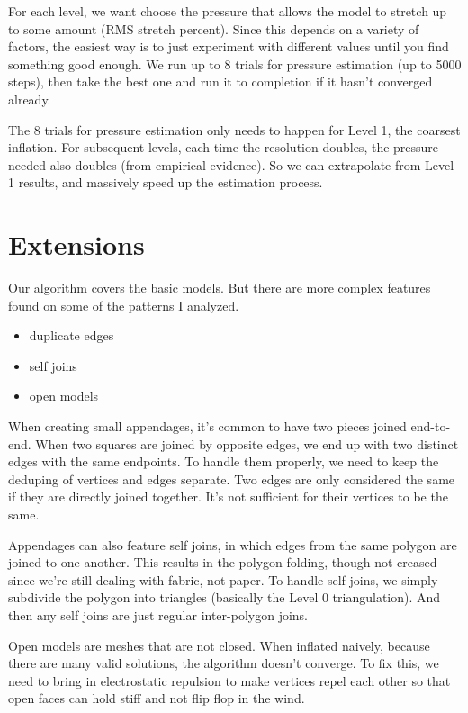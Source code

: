 \documentclass[letterpaper,11pt]{article}
\begin{document}
For each level, we want choose the pressure that allows the model to stretch up to some amount (RMS stretch percent). Since this depends on a variety of factors, the easiest way is to just experiment with different values until you find something good enough. We run up to 8 trials for pressure estimation (up to 5000 steps), then take the best one and run it to completion if it hasn't converged already.

The 8 trials for pressure estimation only needs to happen for Level 1, the coarsest inflation. For subsequent levels, each time the resolution doubles, the pressure needed also doubles (from empirical evidence). So we can extrapolate from Level 1 results, and massively speed up the estimation process.

\section*{Extensions}

Our algorithm covers the basic models. But there are more complex features found on some of the patterns I analyzed.
\begin{itemize}
	\item duplicate edges
	\item self joins
	\item open models
\end{itemize}

When creating small appendages, it's common to have two pieces joined end-to-end. When two squares are joined by opposite edges, we end up with two distinct edges with the same endpoints. To handle them properly, we need to keep the deduping of vertices and edges separate. Two edges are only considered the same if they are directly joined together. It's not sufficient for their vertices to be the same.

Appendages can also feature self joins, in which edges from the same polygon are joined to one another. This results in the polygon folding, though not creased since we're still dealing with fabric, not paper. To handle self joins, we simply subdivide the polygon into triangles (basically the Level 0 triangulation). And then any self joins are just regular inter-polygon joins.

Open models are meshes that are not closed. When inflated naively, because there are many valid solutions, the algorithm doesn't converge. To fix this, we need to bring in electrostatic repulsion to make vertices repel each other so that open faces can hold stiff and not flip flop in the wind.
\end{document}

